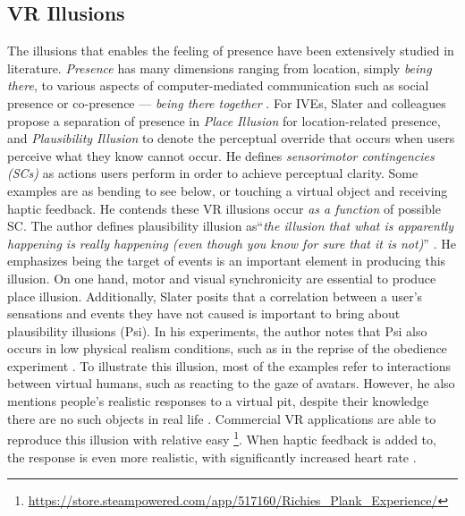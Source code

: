 \subsection{VR Illusions}
The illusions that enables the feeling of presence have been extensively studied in literature. 
\textit{Presence} has many dimensions ranging from location, simply \textit{being there}, to various aspects of computer-mediated communication such as social presence or co-presence --- \textit{being there together} \cite{zhao2003toward}.
For IVEs, Slater and colleagues propose a separation of presence in \textit{Place Illusion} for location-related presence, and \textit{Plausibility Illusion} to denote the perceptual override that occurs when users perceive what they know cannot occur. He defines \textit{sensorimotor contingencies (SCs)} as actions users perform in order to achieve perceptual clarity. Some examples are as bending to see below, or touching a virtual object and receiving haptic feedback. He contends these VR illusions occur \textit{as a function} of possible SC. The author defines plausibility illusion as``\textit{the illusion that what is apparently happening is really happening (even though you know for sure that it is not)}'' \cite{slater2009place}. He emphasizes being the target of events is an important element in producing this illusion. On one hand, motor and visual synchronicity are essential to produce place illusion. Additionally, Slater posits that a correlation between a user's sensations and events they have not caused is important to bring about plausibility illusions (Psi). In his experiments, the author notes that Psi also occurs in low physical realism conditions, such as in the reprise of the obedience experiment \cite{slater2006virtual}. To illustrate this illusion, most of the examples refer to interactions between virtual humans, such as reacting to the gaze of avatars. However, he also mentions people's realistic responses to a virtual pit, despite their knowledge there are no such objects in real life \cite{slater1995taking}. Commercial VR applications are able to reproduce this illusion with relative easy \footnote{\url{https://store.steampowered.com/app/517160/Richies_Plank_Experience/}}. When haptic feedback is added to, the response is even more realistic, with significantly increased heart rate \cite{meehan2002physiological}. 
\\
